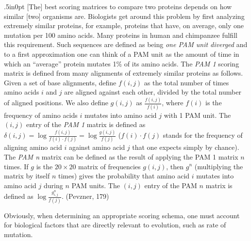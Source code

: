 \documentclass[a4paper]{article}
\begin{document}
\begin{adjustwidth}{.5in}{0pt}
[The] best scoring matrices to compare two proteins depends on how similar [two] organisms are. Biologists get around this problem by first analyzing extremely similar proteins, for example, proteins that have, on average, only one mutation per 100 amino acids. Many proteins in human and chimpanzee fulfill this requirement. Such sequences are defined as being \emph{one PAM unit diverged} and to a first approximation one can think of a PAM unit as the amount of time in which an ``average'' protein mutates 1\% of its amino acids. The \emph{PAM 1} scoring matrix is defined from many alignments of extremely similar proteins as follows. \\ 

Given a set of base alignments, define $f(i,j)$ as the total number of times amino acids $i$ and $j$ are aligned against each other, divided by the total number of aligned positions. We also define $g(i,j)$ as $\tfrac{f(i,j)}{f(i)}$, where $f(i)$ is the frequency of amino acids $i$ mutates into amino acid $j$ with 1 PAM unit. The $(i,j)$ entry of the \emph{PAM 1} matrix is defined as $\delta(i,j) = \log\tfrac{f(i,j)}{f(i)\cdot f(j)} = \log\tfrac{g(i,j)}{f(j)}$ ($f(i) \cdot f(j)$ stands for the frequency of aligning amino acid $i$ against amino acid $j$ that one expects simply by chance). The \emph{PAM n} matrix can be defined as the result of applying the PAM 1 matrix $n$ times. If $g$ is the $20 \times 20$ matrix of frequencies $g(i,j)$, then $g^n$ (multiplying the matrix by itself $n$ times) gives the probability that amino acid $i$ mutates into amino acid $j$ during $n$ PAM units. The $(i,j)$ entry of the PAM $n$ matrix is defined as $\log\tfrac{g^n_{i,j}}{f(j)}$. (Pevzner, 179) \\
\end{adjustwidth} 

Obviously, when determining an appropriate scoring schema, one must account for biological factors that are directly relevant to evolution, such as rate of mutation.  \\
\end{document}
